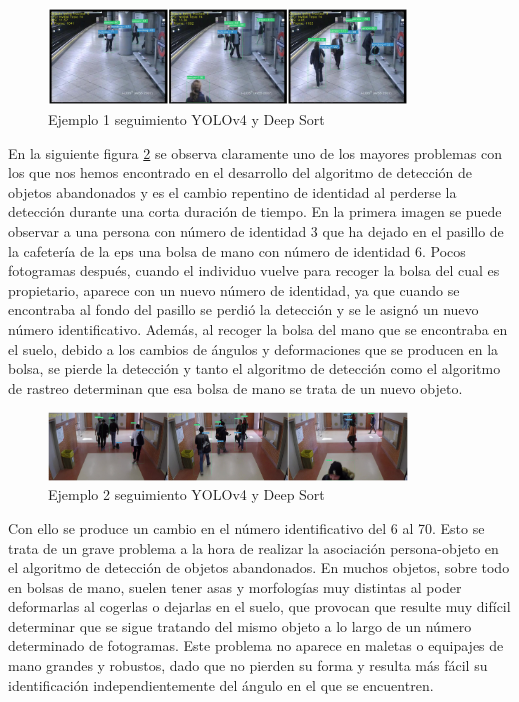 \begin{figure}[ht]
\centering
\includegraphics[width=0.85\textwidth]{img/chapters/resultados/tracking/avss-tracking-result-example.jpg}
\caption{\label{fig:avss-tracking-example}Ejemplo 1 seguimiento YOLOv4 y Deep Sort \cite{AVSSAB2007-dataset}}
\end{figure}

En la siguiente figura \ref{fig:gba-tracking-example} se observa claramente uno de los mayores problemas con los que nos hemos encontrado en el desarrollo del algoritmo de detección de objetos abandonados y es el cambio repentino de identidad al perderse la detección durante una corta duración de tiempo. En la primera imagen se puede observar a una persona con número de identidad 3 que ha dejado en el pasillo de la cafetería de la \gls{eps} una bolsa de mano con número de identidad 6. Pocos fotogramas después, cuando el individuo vuelve para recoger la bolsa del cual es propietario, aparece con un nuevo número de identidad, ya que cuando se encontraba al fondo del pasillo se perdió la detección y se le asignó un nuevo número identificativo. Además, al recoger la bolsa del mano que se encontraba en el suelo, debido a los cambios de ángulos y deformaciones que se producen en la bolsa, se pierde la detección y tanto el algoritmo de detección como el algoritmo de rastreo determinan que esa bolsa de mano se trata de un nuevo objeto.

\begin{figure}[ht]
\centering
\includegraphics[width=0.85\textwidth]{img/chapters/resultados/tracking/gba-tracking-result-example.jpg}
\caption{\label{fig:gba-tracking-example}Ejemplo 2 seguimiento YOLOv4 y Deep Sort \cite{gba-dataset}}
\end{figure}

Con ello se produce un cambio en el número identificativo del 6 al 70. Esto se trata de un grave problema a la hora de realizar la asociación persona-objeto en el algoritmo de detección de objetos abandonados. En muchos objetos, sobre todo en bolsas de mano, suelen tener asas y morfologías muy distintas al poder deformarlas al cogerlas o dejarlas en el suelo, que provocan que resulte muy difícil determinar que se sigue tratando del mismo objeto a lo largo de un número determinado de fotogramas. Este problema no aparece en maletas o equipajes de mano grandes y robustos, dado que no pierden su forma y resulta más fácil su identificación independientemente del ángulo en el que se encuentren.

